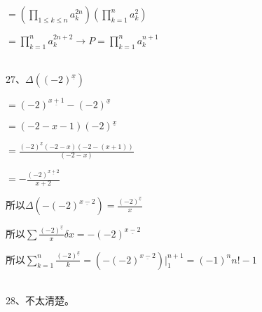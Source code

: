 \documentclass[onecolumn]{article}
\begin{document}
$=\left (\prod_{1\leq k\leq n}a_{k}^{2n}  \right )\left ( \prod _{k=1}^{n}a_{k}^{2} \right )$\par
$= \prod _{k=1}^{n}a_{k}^{2n+2} \rightarrow P=\prod _{k=1}^{n}a_{k}^{n+1}$\par
~\\
27、$\Delta ((-2)^{\underline{x}})$ \par
$=(-2)^{\underline{x+1}}-(-2)^{\underline{x}}$ \par
$=(-2-x-1)(-2)^{\underline{x}}$ \par
$=\frac{(-2)^{\underline{x}}(-2-x)(-2-(x+1))}{(-2-x)}$ \par
$=-\frac{(-2)^{\underline{x+2}}}{x+2}$ \par
所以$\Delta (-(-2)^{\underline{x-2}})=\frac{(-2)^{\underline{x}}}{x}$ \par
所以$\sum \frac{(-2)^{\underline{x}}}{x}\delta x=-(-2)^{\underline{x-2}}$ \par
所以$\sum_{k=1}^{n} \frac{(-2)^{\underline{k}}}{k}=\left (-(-2)^{\underline{x-2}}  \right  )|_{1}^{n+1}=(-1)^{n}n!-1$ \par
~\\
28、不太清楚。\par
~\\
\end{document}
